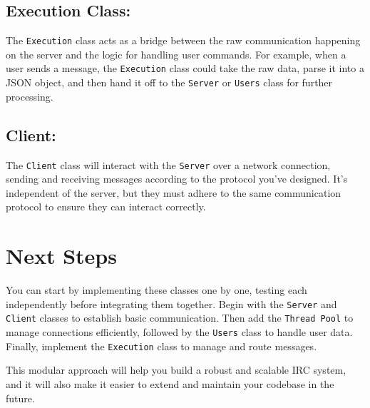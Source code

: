 \documentclass{article}
\begin{document}
\subsection*{Execution Class:}
The \texttt{Execution} class acts as a bridge between the raw communication happening on the server and the logic for handling user commands. For example, when a user sends a message, the \texttt{Execution} class could take the raw data, parse it into a JSON object, and then hand it off to the \texttt{Server} or \texttt{Users} class for further processing.

\subsection*{Client:}
The \texttt{Client} class will interact with the \texttt{Server} over a network connection, sending and receiving messages according to the protocol you've designed. It’s independent of the server, but they must adhere to the same communication protocol to ensure they can interact correctly.

\section*{Next Steps}

You can start by implementing these classes one by one, testing each independently before integrating them together. Begin with the \texttt{Server} and \texttt{Client} classes to establish basic communication. Then add the \texttt{Thread Pool} to manage connections efficiently, followed by the \texttt{Users} class to handle user data. Finally, implement the \texttt{Execution} class to manage and route messages.

This modular approach will help you build a robust and scalable IRC system, and it will also make it easier to extend and maintain your codebase in the future.
\end{document}
